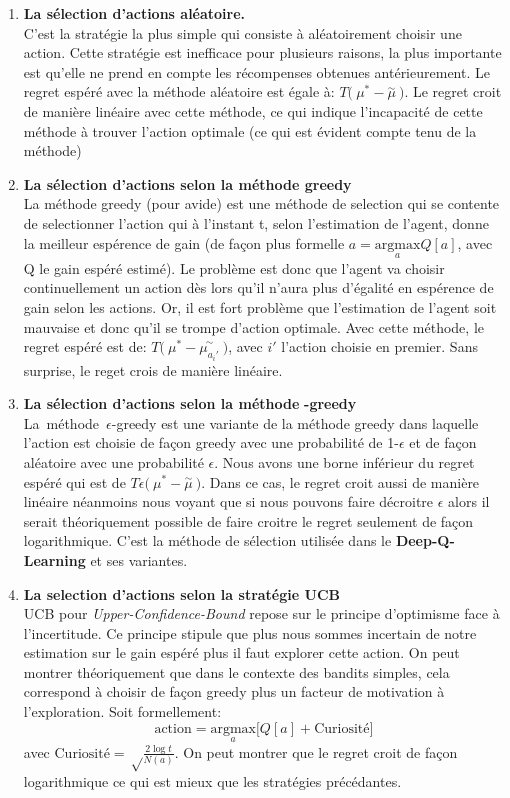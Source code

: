 \begin{enumerate}
\item \textbf{La sélection d'actions aléatoire.}\\
C'est la stratégie la plus simple qui consiste à aléatoirement choisir une action. Cette stratégie est inefficace pour plusieurs raisons, la plus importante est qu'elle ne prend en compte les récompenses obtenues antérieurement.
Le regret espéré avec la méthode aléatoire est égale à: $T \big(\:\mu^* - \overset{\sim}{\mu}\: \big)$. Le regret croit de manière linéaire avec cette méthode, ce qui indique l'incapacité de cette méthode à trouver l'action optimale (ce qui est évident compte tenu de la méthode)
\item \textbf{La sélection d'actions selon la méthode greedy}\\
    La méthode greedy (pour avide) est une méthode de selection qui se contente de selectionner l'action qui à l'instant t, selon l'estimation de l'agent, donne la meilleur espérence de gain (de façon plus formelle $ a = \underset{a}{\text{argmax}} Q[a]$, avec Q le gain espéré estimé). Le problème est donc que l'agent va choisir continuellement un action dès lors qu'il n'aura plus d'égalité en espérence de gain selon les actions. Or, il est fort problème que l'estimation de l'agent soit mauvaise et donc qu'il se trompe d'action optimale. Avec cette méthode, le regret espéré est de: $T \big(\:\mu^* - \overset{\sim}{\mu_{a_i'}}\: \big)$, avec $i'$ l'action choisie en premier. Sans surprise, le reget crois de manière linéaire.
\item \textbf{La sélection d'actions selon la méthode} \bm{\epsilon} \textbf{-greedy} \\
    La\ méthode\ $\epsilon$-greedy est une variante de la méthode greedy dans laquelle l'action est choisie de façon greedy avec une probabilité de 1-$\epsilon$ et de façon aléatoire avec une probabilité $\epsilon$. Nous avons une borne inférieur du regret espéré qui est de $T \epsilon \big(\:\mu^* - \overset{\sim}{\mu}\: \big)$. Dans ce cas, le regret croit aussi de manière linéaire néanmoins nous voyant que si nous pouvons faire décroitre $\epsilon$ alors il serait théoriquement possible de faire croitre le regret seulement de façon logarithmique. C'est la méthode de sélection utilisée dans le \textbf{Deep-Q-Learning} et ses variantes. 

\item \textbf{La selection d'actions selon la stratégie UCB} \\
    \gls{UCB} pour \emph{Upper-Confidence-Bound} repose sur le principe d'optimisme face à l'incertitude. Ce principe stipule que plus nous sommes incertain de notre estimation sur le gain espéré plus il faut explorer cette action. On peut montrer théoriquement que dans le contexte des bandits simples, cela correspond à choisir de façon greedy plus un facteur de motivation à l'exploration. Soit formellement: 
    $$ \text{action} = \underset{a}{\text{argmax}}\bigg[Q[a] + \text{Curiosité}\bigg]  $$
    avec $\text{Curiosité} = \sqrt\frac{2\log t}{N(a)}$. On peut montrer que le regret croit de façon logarithmique ce qui est mieux que les stratégies précédantes.
\end{enumerate}



